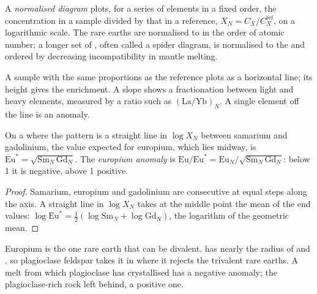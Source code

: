 \begin{definition}\label{def:b2:elements-in-the-earth:normalised}
A \emph{normalised diagram} plots, for a series of
elements in a fixed order, the concentration in a sample divided by that in a
reference, $X_N = C_X/C_X^{\mathrm{ref}}$, on a logarithmic scale. The rare earths
are normalised to  in the order of atomic number; a longer set of
, often called a spider diagram, is normalised to the
 and ordered by decreasing incompatibility in mantle melting.
\end{definition}

A sample with the same proportions as the reference plots as a horizontal line;
its height gives the enrichment. A slope shows a fractionation between light and
heavy elements, measured by a ratio such as $(\mathrm{La}/\mathrm{Yb})_N$. A
single element off the line is an anomaly.

\begin{proposition}\label{prop:b2:elements-in-the-earth:normalised}
On a  where the pattern is a straight line in
$\log X_N$ between samarium and gadolinium, the value expected for europium, which
lies midway, is $\mathrm{Eu}^* = \sqrt{\mathrm{Sm}_N\,\mathrm{Gd}_N}$. The
\emph{europium anomaly} is
$\mathrm{Eu}/\mathrm{Eu}^* = \mathrm{Eu}_N/\sqrt{\mathrm{Sm}_N\,\mathrm{Gd}_N}$:
below 1 it is negative, above 1 positive.
\end{proposition}

\begin{proof}
Samarium, europium and gadolinium are consecutive at equal steps along the axis.
A straight line in $\log X_N$ takes at the middle point the mean of the end values:
$\log \mathrm{Eu}^* = \tfrac12(\log \mathrm{Sm}_N + \log \mathrm{Gd}_N)$, the
logarithm of the geometric mean.
\end{proof}

Europium is the one rare earth that can be divalent.  has nearly the
radius of  and , so plagioclase feldspar takes it in where it
rejects the trivalent rare earths. A melt from which plagioclase has crystallised
has a negative anomaly; the plagioclase-rich rock left behind, a positive one.

